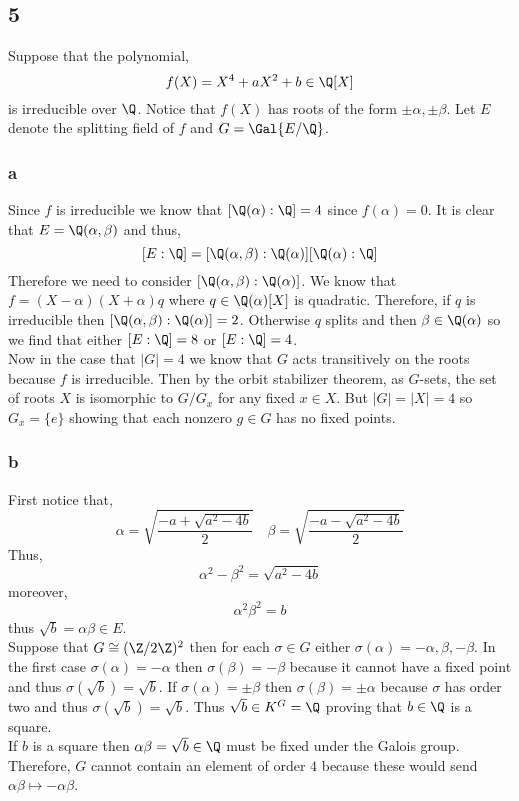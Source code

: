 \documentclass[12pt]{article}
\begin{document}
\subsection{5}

Suppose that the polynomial,
\[ f(X) = X^4 + a X^2 + b \in \Q[X] \]
is irreducible over $\Q$. Notice that $f(X)$ has roots of the form $\pm \alpha, \pm \beta$. Let $E$ denote the splitting field of $f$ and $G = \Gal{E/\Q}$. 

\subsubsection{a}

Since $f$ is irreducible we know that $[\Q(\alpha) : \Q] = 4$ since $f(\alpha) = 0$. It is clear that $E = \Q(\alpha, \beta)$ and thus,
\[ [E : \Q] = [\Q(\alpha, \beta) : \Q(\alpha)] [\Q(\alpha) : \Q] \]
Therefore we need to consider $[\Q(\alpha, \beta) : \Q(\alpha)]$. We know that $f = (X - \alpha)(X + \alpha) q$ where $q \in \Q(\alpha)[X]$ is quadratic. Therefore, if $q$ is irreducible then $[\Q(\alpha, \beta) : \Q(\alpha)] = 2$. Otherwise $q$ splits and then $\beta \in \Q(\alpha)$ so we find that either $[E : \Q] = 8$ or $[E : \Q] = 4$.
\bigskip\\
Now in the case that $|G| = 4$ we know that $G$ acts transitively on the roots because $f$ is irreducible. Then by the orbit stabilizer theorem, as $G$-sets, the set of roots $X$ is isomorphic to $G / G_x$ for any fixed $x \in X$. But $|G| = |X| = 4$ so $G_x = \{ e \}$ showing that each nonzero $g \in G$ has no fixed points.

\subsubsection{b}

First notice that,
\[ \alpha = \sqrt{\frac{-a + \sqrt{a^2 - 4 b}}{2}} \quad \beta = \sqrt{\frac{-a - \sqrt{a^2 - 4b}}{2}} \]
Thus,
\[ \alpha^2 - \beta^2 = \sqrt{a^2 - 4 b} \]
moreover,
\[ \alpha^2 \beta^2 = b \]
thus $\sqrt{b} = \alpha \beta \in E$.
\bigskip\\
Suppose that $G \cong (\Z / 2 \Z)^2$ then for each $\sigma \in G$ either $\sigma(\alpha) = - \alpha, \beta, -\beta$. In the first case $\sigma(\alpha) = - \alpha$ then $\sigma(\beta) = - \beta$ because it cannot have a fixed point and thus $\sigma(\sqrt{b}) = \sqrt{b}$. If $\sigma(\alpha) = \pm \beta$ then $\sigma(\beta) = \pm \alpha$ because $\sigma$ has order two and thus $\sigma(\sqrt{b}) = \sqrt{b}$. Thus $\sqrt{b} \in K^G = \Q$ proving that $b \in \Q$ is a square.
\bigskip\\
If $b$ is a square then $\alpha \beta = \sqrt{b} \in \Q$ must be fixed under the Galois group. Therefore, $G$ cannot contain an element of order $4$ because these would send $\alpha \beta \mapsto - \alpha \beta$.
\end{document}
